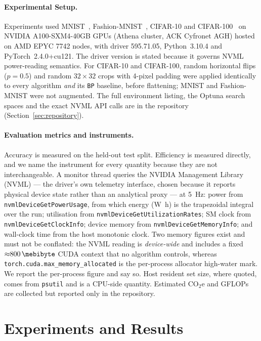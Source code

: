 \documentclass{llncs}
\newcommand{\BP}{\texttt{BP}}
\begin{document}
\paragraph{Experimental Setup.}
Experiments used MNIST~\cite{lecun1998gradient},
Fashion-MNIST~\cite{xiao2017fashion}, CIFAR-10 and
CIFAR-100~\cite{krizhevsky2009learning} on NVIDIA A100-SXM4-40GB GPUs
(Athena cluster, ACK Cyfronet AGH) hosted on AMD EPYC 7742 nodes, with
driver 595.71.05, Python~3.10.4 and PyTorch~2.4.0+cu121. The driver version
is stated because it governs NVML power-reading semantics. For CIFAR-10 and
CIFAR-100, random horizontal flips ($p{=}0.5$) and random $32{\times}32$
crops with 4-pixel padding were applied identically to every algorithm
\emph{and} its \BP{} baseline, before flattening; MNIST and Fashion-MNIST
were not augmented. The full environment listing, the Optuna search spaces
and the exact NVML API calls are in the repository
(Section~\ref{sec:repository}).

\paragraph{Evaluation metrics and instruments.}
Accuracy is measured on the held-out test split. Efficiency is measured
directly, and we name the instrument for every quantity because they are not
interchangeable. A monitor thread queries the NVIDIA Management Library
(NVML) --- the driver's own telemetry interface, chosen because it reports
physical device state rather than an analytical proxy --- at \SI{5}{\hertz}:
power
from \texttt{nvmlDeviceGetPowerUsage}, from which energy (\si{\watt\hour}) is
the trapezoidal integral over the run; utilisation from
\texttt{nvmlDeviceGetUtilizationRates}; SM clock from
\texttt{nvmlDeviceGetClockInfo}; device memory from
\texttt{nvmlDeviceGetMemoryInfo}; and wall-clock time from the host monotonic
clock. Two memory figures exist and must not be conflated: the NVML reading is
\emph{device-wide} and includes a fixed ${\approx}\SI{800}{\mebibyte}$ CUDA
context that no algorithm controls, whereas
\texttt{torch.cuda.max\_memory\_allocated} is the per-process allocator
high-water mark. We report the per-process figure and say so. Host resident set
size, where quoted, comes from \texttt{psutil} and is a CPU-side quantity.
Estimated CO$_2$e and GFLOPs are collected but reported only in the repository.

\section{Experiments and Results}
\label{sec:experiments}
\end{document}

